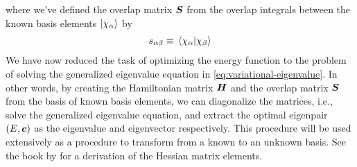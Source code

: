             where we've defined the overlap matrix $\boldsymbol{S}$ from the
            overlap integrals between the known basis elements
            $\ket{\chi_{\alpha}}$ by
            \begin{align}
                s_{\alpha\beta}
                \equiv
                \braket*{\chi_{\alpha}}{\chi_{\beta}}
            \end{align}
            We have now reduced the task of optimizing the energy function to
            the problem of solving the generalized eigenvalue equation in
            \autoref{eq:variational-eigenvalue}.
            In other words, by creating the Hamiltonian matrix $\boldsymbol{H}$ and
            the overlap matrix $\boldsymbol{S}$ from the basis of known basis
            elements, we can diagonalize the matrices, i.e., solve the
            generalized eigenvalue equation, and extract the optimal eigenpair
            $(E, \boldsymbol{c})$ as the eigenvalue and eigenvector respectively.
            This procedure will be used extensively as a procedure to transform
            from a known to an unknown basis.
            See the book  by
            \citeauthor{helgaker-molecular} \cite{helgaker-molecular} for a
            derivation of the Hessian matrix elements.

